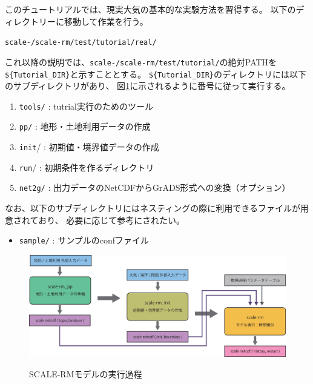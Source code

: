 このチュートリアルでは、現実大気の基本的な実験方法を習得する。
以下のディレクトリーに移動して作業を行う。
\begin{alltt}
 scale-{\version}/scale-rm/test/tutorial/real/
\end{alltt}
これ以降の説明では、\texttt{scale-{\version}/scale-rm/test/tutorial/}の絶対PATHを
\verb|${Tutorial_DIR}|と示すこととする。
\verb|${Tutorial_DIR}|のディレクトリには以下のサブディレクトリがあり、
図\ref{fig:howto}に示されるように番号に従って実行する。
\begin{enumerate}
\item  \texttt{tools/}   : tutrial実行のためのツール
\item  \texttt{pp/}      : 地形・土地利用データの作成
\item  \texttt{init}/    : 初期値・境界値データの作成
\item  \texttt{run}/     : 初期条件を作るディレクトリ
\item  \texttt{net2g/}   : 出力データのNetCDFからGrADS形式への変換（オプション） 
\end{enumerate}
なお、以下のサブディレクトリにはネスティングの際に利用できるファイルが用意されており、
必要に応じて参考にされたい。
\begin{itemize}
\item  \texttt{sample/}  : サンプルのconfファイル
\end{itemize}


\begin{figure}[b]
\begin{center}
  \includegraphics[width=0.9\hsize]{./figure/real_procedure.eps}\\
  \caption{SCALE-RMモデルの実行過程}
  \label{fig:howto}
\end{center}
\end{figure}

